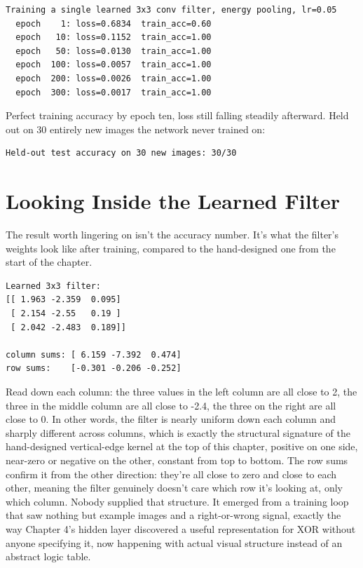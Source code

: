 \begin{Verbatim}[fontsize=\small, frame=single, xleftmargin=1em, xrightmargin=1em]
Training a single learned 3x3 conv filter, energy pooling, lr=0.05
  epoch    1: loss=0.6834  train_acc=0.60
  epoch   10: loss=0.1152  train_acc=1.00
  epoch   50: loss=0.0130  train_acc=1.00
  epoch  100: loss=0.0057  train_acc=1.00
  epoch  200: loss=0.0026  train_acc=1.00
  epoch  300: loss=0.0017  train_acc=1.00
\end{Verbatim}

Perfect training accuracy by epoch ten, loss still falling steadily afterward. Held out on 30 entirely new images the network never trained on:

\begin{Verbatim}[fontsize=\small, frame=single, xleftmargin=1em, xrightmargin=1em]
Held-out test accuracy on 30 new images: 30/30
\end{Verbatim}

\section*{Looking Inside the Learned Filter}

The result worth lingering on isn't the accuracy number. It's what the filter's weights look like after training, compared to the hand-designed one from the start of the chapter.

\begin{Verbatim}[fontsize=\small, frame=single, xleftmargin=1em, xrightmargin=1em]
Learned 3x3 filter:
[[ 1.963 -2.359  0.095]
 [ 2.154 -2.55   0.19 ]
 [ 2.042 -2.483  0.189]]

column sums: [ 6.159 -7.392  0.474]
row sums:    [-0.301 -0.206 -0.252]
\end{Verbatim}

Read down each column: the three values in the left column are all close to 2, the three in the middle column are all close to -2.4, the three on the right are all close to 0. In other words, the filter is nearly uniform down each column and sharply different across columns, which is exactly the structural signature of the hand-designed vertical-edge kernel at the top of this chapter, positive on one side, near-zero or negative on the other, constant from top to bottom. The row sums confirm it from the other direction: they're all close to zero and close to each other, meaning the filter genuinely doesn't care which row it's looking at, only which column. Nobody supplied that structure. It emerged from a training loop that saw nothing but example images and a right-or-wrong signal, exactly the way Chapter 4's hidden layer discovered a useful representation for XOR without anyone specifying it, now happening with actual visual structure instead of an abstract logic table.

